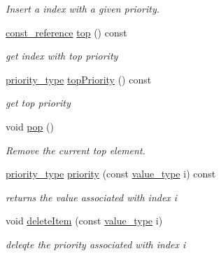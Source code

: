 \begin{DoxyCompactItemize}
\begin{DoxyCompactList}\small\item\em Insert a index with a given priority. \end{DoxyCompactList}\item 
\hyperlink{classnifty_1_1tools_1_1ChangeablePriorityQueue_acb7eb23bd9ca7c52955adc06bf4816c3}{const\+\_\+reference} \hyperlink{classnifty_1_1tools_1_1ChangeablePriorityQueue_a550194380fddc3658871dbb64b59960d}{top} () const
\begin{DoxyCompactList}\small\item\em get index with top priority \end{DoxyCompactList}\item 
\hyperlink{classnifty_1_1tools_1_1ChangeablePriorityQueue_a6ecafb387f99a1cfa7ff5795c924682c}{priority\+\_\+type} \hyperlink{classnifty_1_1tools_1_1ChangeablePriorityQueue_a2839b67aa76dc79afd492466aeaea3dd}{top\+Priority} () const
\begin{DoxyCompactList}\small\item\em get top priority \end{DoxyCompactList}\item 
void \hyperlink{classnifty_1_1tools_1_1ChangeablePriorityQueue_a7c5e4f9f3f2a837a9a1738144c76c17d}{pop} ()
\begin{DoxyCompactList}\small\item\em Remove the current top element. \end{DoxyCompactList}\item 
\hyperlink{classnifty_1_1tools_1_1ChangeablePriorityQueue_a6ecafb387f99a1cfa7ff5795c924682c}{priority\+\_\+type} \hyperlink{classnifty_1_1tools_1_1ChangeablePriorityQueue_af437e744315c988b3cddbe66b4cfbe68}{priority} (const \hyperlink{classnifty_1_1tools_1_1ChangeablePriorityQueue_aa00fbc748b94bdc6175b4c49bb2bba48}{value\+\_\+type} i) const
\begin{DoxyCompactList}\small\item\em returns the value associated with index i \end{DoxyCompactList}\item 
void \hyperlink{classnifty_1_1tools_1_1ChangeablePriorityQueue_af5b15b7c4cfedc7f95d168553a06a189}{delete\+Item} (const \hyperlink{classnifty_1_1tools_1_1ChangeablePriorityQueue_aa00fbc748b94bdc6175b4c49bb2bba48}{value\+\_\+type} i)
\begin{DoxyCompactList}\small\item\em deleqte the priority associated with index i \end{DoxyCompactList}\item 

\end{DoxyCompactItemize}
